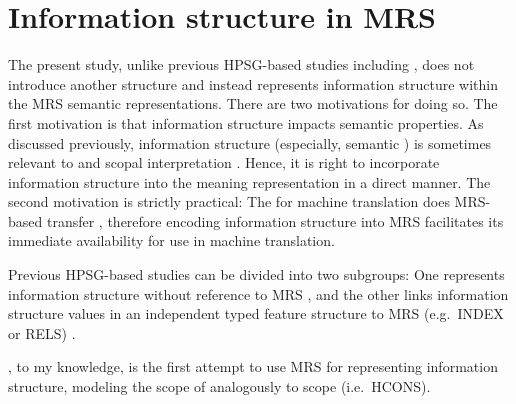 \section{Information structure in MRS}
\label{8:sec:mrs}


The present study, unlike previous HPSG-based studies including
\citet{engdahl:vallduvi:96}, does not introduce another structure and
instead represents information structure within the MRS semantic
representations. There are two motivations for doing so. The
first motivation is that information structure impacts semantic
properties. As discussed previously, information structure
(especially, semantic ) is sometimes relevant to
 \citep{gundel:99} and scopal interpretation
\citep{buring:97,portner:yabushita:98,erteschik:99,erteschik:07,bianchi:frascarelli:10}.
Hence, it is right to incorporate information structure into the
meaning representation in a direct manner.  The second motivation is
strictly practical: The  for machine translation
does MRS-based transfer \citep{oepen:etal:07}, therefore encoding
information structure into MRS facilitates its immediate availability
for use in machine translation.




Previous HPSG-based studies can be divided into two subgroups: One
represents information structure without reference to MRS
\citep{dekuthy:00,chang:02,chung:etal:03,ohtani:matsumoto:04,webelhuth:07,kim:07,kim:12a},
and the other links information structure values in an independent
typed feature structure to MRS (e.g.\ INDEX or RELS)
\citep{wilcock:05,yoshimoto:etal:06,paggio:09,bildhauer:cook:10,sato:tam:12}.



\citet{wilcock:05}, to my knowledge, is the first attempt to use MRS
for representing information structure, modeling the scope of
 analogously to  scope
(i.e.\ HCONS).





